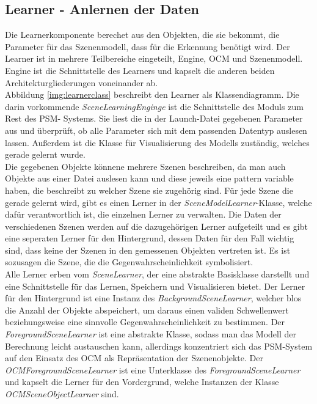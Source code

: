 \subsection{Learner - Anlernen der Daten}
Die Learnerkomponente berechet aus den Objekten, die sie bekommt, die Parameter für das Szenenmodell, dass für die Erkennung benötigt wird. Der Learner ist in mehrere Teilbereiche eingeteilt, Engine, OCM und Szenenmodell. Engine ist die Schnittstelle des Learners und kapselt die anderen beiden Architekturgliederungen voneinander ab.\smallskip\\
Abbildung \ref{img:learnerclass} beschreibt den Learner als Klassendiagramm. Die darin vorkommende \textit{SceneLearningEnginge} ist die Schnittstelle des Moduls zum Rest des PSM- Systems. Sie liest die in der Launch-Datei gegebenen Parameter aus und überprüft, ob alle Parameter sich mit dem passenden Datentyp auslesen lassen. Außerdem ist die Klasse für Visualisierung des Modells zuständig, welches gerade gelernt wurde. \smallskip\\
Die gegebenen Objekte könnene mehrere Szenen beschreiben, da man auch Objekte aus einer Datei auslesen kann und diese jeweils eine pattern variable haben, die beschreibt zu welcher Szene sie zugehörig sind. Für jede Szene die gerade gelernt wird, gibt es einen Lerner in der \textit{SceneModelLearner}-Klasse, welche dafür verantwortlich ist, die einzelnen Lerner zu verwalten. Die Daten der verschiedenen Szenen werden auf die dazugehörigen Lerner aufgeteilt und es gibt eine seperaten Lerner für den Hintergrund, dessen Daten für den Fall wichtig sind, dass keine der Szenen in den gemessenen Objekten vertreten ist. Es ist sozusagen die Szene, die die Gegenwahrscheinlichkeit symbolisiert.\smallskip\\
Alle Lerner erben vom \textit{SceneLearner}, der eine abstrakte Basisklasse darstellt und eine Schnittstelle für das Lernen, Speichern und Visualisieren bietet. Der Lerner für den Hintergrund ist eine Instanz des \textit{BackgroundSceneLearner}, welcher blos die Anzahl der Objekte abspeichert, um daraus einen validen Schwellenwert beziehungsweise eine sinnvolle Gegenwahrscheinlichkeit zu bestimmen. Der \textit{ForegroundSceneLearner} ist eine abstrakte Klasse, sodass man das Modell der Berechnung leicht austauschen kann, allerdings konzentriert sich das PSM-System auf den Einsatz des OCM als Repräsentation der Szenenobjekte. Der \textit{OCMForegroundSceneLearner} ist eine Unterklasse des \textit{ForegroundSceneLearner} und kapselt die Lerner für den Vordergrund, welche Instanzen der Klasse \textit{OCMSceneObjectLearner} sind.
